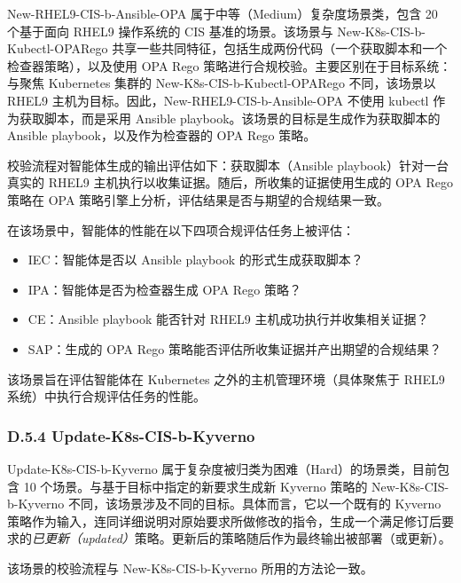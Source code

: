 \documentclass[10pt,UTF8,fontset=fandol]{ctexart}
\begin{document}
New-RHEL9-CIS-b-Ansible-OPA 属于中等（Medium）复杂度场景类，包含 20 个基于面向 RHEL9 操作系统的 CIS 基准的场景。该场景与 New-K8s-CIS-b-Kubectl-OPARego 共享一些共同特征，包括生成两份代码（一个获取脚本和一个检查器策略），以及使用 OPA Rego 策略进行合规校验。主要区别在于目标系统：与聚焦 Kubernetes 集群的 New-K8s-CIS-b-Kubectl-OPARego 不同，该场景以 RHEL9 主机为目标。因此，New-RHEL9-CIS-b-Ansible-OPA 不使用 kubectl 作为获取脚本，而是采用 Ansible playbook。该场景的目标是生成作为获取脚本的 Ansible playbook，以及作为检查器的 OPA Rego 策略。

校验流程对智能体生成的输出评估如下：获取脚本（Ansible playbook）针对一台真实的 RHEL9 主机执行以收集证据。随后，所收集的证据使用生成的 OPA Rego 策略在 OPA 策略引擎上分析，评估结果是否与期望的合规结果一致。

在该场景中，智能体的性能在以下四项合规评估任务上被评估：

\begin{itemize}
\item IEC：智能体是否以 Ansible playbook 的形式生成获取脚本？
\item IPA：智能体是否为检查器生成 OPA Rego 策略？
\item CE：Ansible playbook 能否针对 RHEL9 主机成功执行并收集相关证据？
\item SAP：生成的 OPA Rego 策略能否评估所收集证据并产出期望的合规结果？
\end{itemize}

该场景旨在评估智能体在 Kubernetes 之外的主机管理环境（具体聚焦于 RHEL9 系统）中执行合规评估任务的性能。

\subsubsection{D.5.4 Update-K8s-CIS-b-Kyverno}

Update-K8s-CIS-b-Kyverno 属于复杂度被归类为困难（Hard）的场景类，目前包含 10 个场景。与基于目标中指定的新要求生成新 Kyverno 策略的 New-K8s-CIS-b-Kyverno 不同，该场景涉及不同的目标。具体而言，它以一个既有的 Kyverno 策略作为输入，连同详细说明对原始要求所做修改的指令，生成一个满足修订后要求的\textit{已更新（updated）}策略。更新后的策略随后作为最终输出被部署（或更新）。

该场景的校验流程与 New-K8s-CIS-b-Kyverno 所用的方法论一致。
\end{document}
